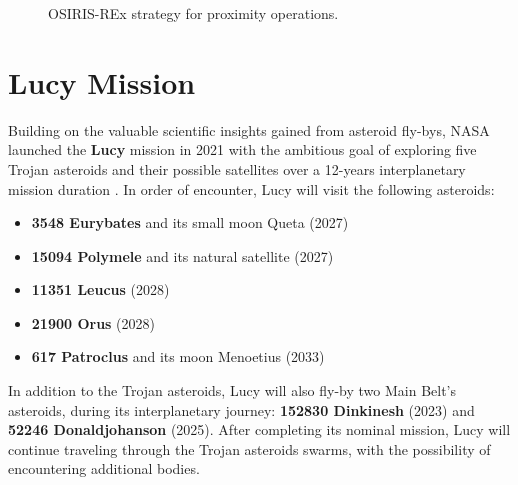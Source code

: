 \documentclass{Configuration_gigi/PoliMi3i_thesis}
\begin{document}
\begin{figure}[H]
    \centering
     \newline
    \caption[OSIRIS-REX proximity operations.]{OSIRIS-REx strategy for proximity operations.}
    \label{fig:osirisrexCPO}
\end{figure}


\section{Lucy Mission}\label{Sec:Lucy Mission}

Building on the valuable scientific insights gained from asteroid fly-bys, NASA launched the \textbf{Lucy} mission in 2021 with the ambitious goal of exploring five Trojan asteroids and their possible satellites over a 12-years interplanetary mission duration \cite{lucy}. In order of encounter, Lucy will visit the following asteroids:

\begin{itemize}
    \item \textbf{3548 Eurybates} and its small moon Queta (2027)
    \item \textbf{15094 Polymele} and its natural satellite (2027)
    \item \textbf{11351 Leucus} (2028)
    \item \textbf{21900 Orus} (2028)
    \item \textbf{617 Patroclus} and its moon Menoetius (2033)
\end{itemize}

In addition to the Trojan asteroids, Lucy will also fly-by two Main Belt's asteroids, during its interplanetary journey: \textbf{152830 Dinkinesh} (2023) and \textbf{52246 Donaldjohanson} (2025). After completing its nominal mission, Lucy will continue traveling through the Trojan asteroids swarms, with the possibility of encountering additional bodies.
\end{document}
